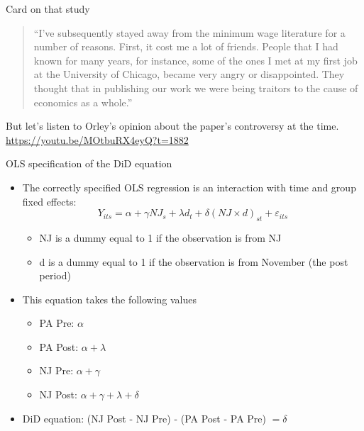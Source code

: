 \documentclass{beamer}
\begin{document}
\begin{frame}{Card on that study}

\begin{quote}
``I’ve subsequently stayed away from the minimum wage literature for a number of reasons. First, it cost me a lot of friends. People that I had known for many years, for instance, some of the ones I met at my first job at the University of Chicago, became very angry or disappointed. They thought that in publishing our work we were being traitors to the cause of economics as a whole.''
\end{quote}

\bigskip

But let's listen to Orley's opinion about the paper's controversy at the time.  \url{https://youtu.be/MOtbuRX4eyQ?t=1882}

\end{frame}


\begin{frame}{OLS specification of the DiD equation}
	
	\begin{itemize}
	\item The correctly specified OLS regression is an interaction with time and group fixed effects:$$Y_{its} = \alpha + \gamma NJ_s + \lambda d_t + \delta (NJ \times d)_{st} + \varepsilon_{its}$$
		\begin{itemize}
		\item NJ is a dummy equal to 1 if the observation is from NJ
		\item d is a dummy equal to 1 if the observation is from November (the post period)
		\end{itemize}
	\item This equation takes the following values
		\begin{itemize}
		\item PA Pre: $\alpha$
		\item PA Post: $\alpha + \lambda$
		\item NJ Pre: $\alpha + \gamma$
		\item NJ Post: $\alpha + \gamma + \lambda + \delta$
		\end{itemize}
	\item DiD equation: (NJ Post - NJ Pre) - (PA Post - PA Pre) $= \delta$
	\end{itemize}
\end{frame}
\end{document}
